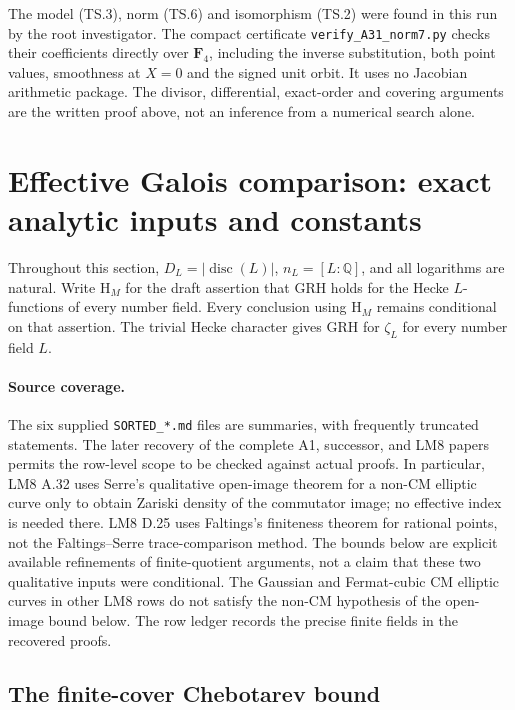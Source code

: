 \documentclass[11pt,a4paper]{article}
\begin{document}
The model (TS.3), norm (TS.6) and isomorphism (TS.2) were found
in this run by the root investigator.  The compact certificate
\texttt{verify\_A31\_norm7.py} checks their coefficients directly
over $\mathbf F_4$, including the inverse substitution, both point
values, smoothness at $X=0$ and the signed unit orbit.  It uses no
Jacobian arithmetic package.  The divisor, differential, exact-order
and covering arguments are the written proof above, not an
inference from a numerical search alone.


\section{Effective Galois comparison: exact analytic inputs and constants}
\label{sec:effective-galois}

Throughout this section, $D_L=|\operatorname{disc}(L)|$, $n_L=[L:\mathbb Q]$, and all logarithms are natural.  Write $\mathrm{H}_M$ for the draft assertion that GRH holds for the Hecke $L$-functions of every number field.  Every conclusion using $\mathrm{H}_M$ remains conditional on that assertion.  The trivial Hecke character gives GRH for $\zeta_L$ for every number field $L$.

\paragraph{Source coverage.}
The six supplied \texttt{SORTED\_*.md} files are summaries, with frequently truncated statements.  The later recovery of the complete A1, successor, and LM8 papers permits the row-level scope to be checked against actual proofs.  In particular, LM8 A.32 uses Serre's qualitative open-image theorem for a non-CM elliptic curve only to obtain Zariski density of the commutator image; no effective index is needed there.  LM8 D.25 uses Faltings's finiteness theorem for rational points, not the Faltings--Serre trace-comparison method.  The bounds below are explicit available refinements of finite-quotient arguments, not a claim that these two qualitative inputs were conditional.  The Gaussian and Fermat-cubic CM elliptic curves in other LM8 rows do not satisfy the non-CM hypothesis of the open-image bound below.  The row ledger records the precise finite fields in the recovered proofs.

\subsection{The finite-cover Chebotarev bound}
\end{document}
